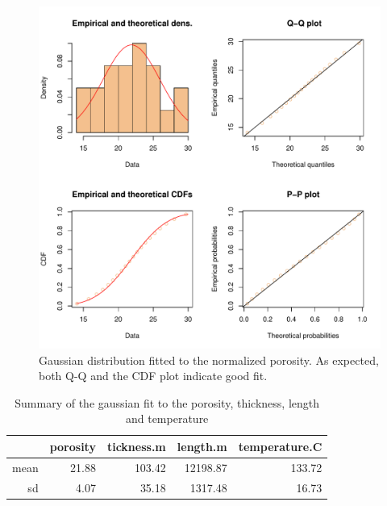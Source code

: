 \documentclass[review,authoryear, 12pt]{elsarticle}\usepackage[]{graphicx}\usepackage[]{color}
\makeatletter
\def\maxwidth{ %
  \ifdim\Gin@nat@width>\linewidth
    \linewidth
  \else
    \Gin@nat@width
  \fi
}
\newenvironment{knitrout}{}{} %
\makeatother
\begin{document}
\begin{knitrout}
\begin{figure}[]
\end{figure}


\end{knitrout}

\begin{knitrout}
\color{fgcolor}\begin{figure}[]

\includegraphics[width=\maxwidth]{figure/poro_norm_fit} \caption[Gaussian distribution fitted to the normalized porosity]{Gaussian distribution fitted to the normalized porosity. As expected, both Q-Q and the CDF plot indicate good fit.\label{Fig:poro_norm_fit}}
\end{figure}


\end{knitrout}


\begin{table}[ht]
\centering
\begin{tabular}{rrrrr}
  \hline
 & porosity & tickness.m & length.m & temperature.C \\ 
  \hline
mean & 21.88 & 103.42 & 12198.87 & 133.72 \\ 
  sd & 4.07 & 35.18 & 1317.48 & 16.73 \\ 
   \hline
\end{tabular}
\caption{{Summary of the gaussian fit to the porosity, thickness, length and temperature}} 
\label{Tab:poro_etc_fit}
\end{table}
\end{document}
